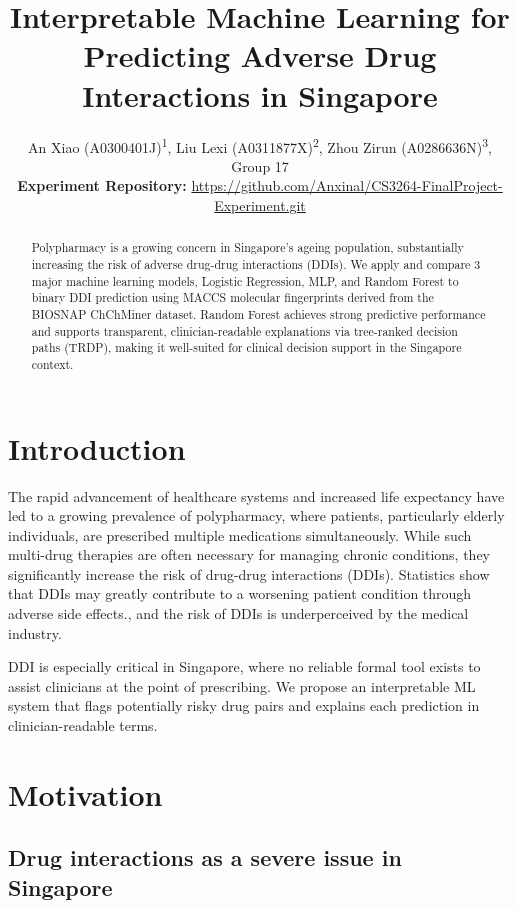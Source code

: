 \documentclass[letterpaper]{article} %
\title{Interpretable Machine Learning for Predicting Adverse Drug Interactions in Singapore}
\author{
    An Xiao (A0300401J)\textsuperscript{\rm 1},
    Liu Lexi (A0311877X)\textsuperscript{\rm 2},
    Zhou Zirun (A0286636N)\textsuperscript{\rm 3},
    Group 17\\
    \textbf{Experiment Repository:} \url{https://github.com/Anxinal/CS3264-FinalProject-Experiment.git}
}
\begin{document}
\maketitle



\begin{abstract}
Polypharmacy is a growing concern in Singapore's ageing population, substantially increasing the risk of adverse drug-drug interactions (DDIs). We apply and compare 3 major machine learning models, Logistic Regression, MLP, and Random Forest to binary DDI prediction using MACCS molecular fingerprints derived from the BIOSNAP ChChMiner dataset. Random Forest achieves strong predictive performance and supports transparent, clinician-readable explanations via tree-ranked decision paths (TRDP), making it well-suited for clinical decision support in the Singapore context.
\end{abstract}

\section{Introduction}

The rapid advancement of healthcare systems and increased life expectancy have led to a growing prevalence of polypharmacy, where patients, particularly elderly individuals, are prescribed multiple medications simultaneously. While such multi-drug therapies are often necessary for managing chronic conditions, they significantly increase the risk of drug-drug interactions (DDIs). Statistics show that DDIs may greatly contribute to a worsening patient condition through adverse side effects.\cite{Chan2016:chan}, and the risk of DDIs is underperceived by the medical industry.\cite{polypharmacy}

DDI is especially critical in Singapore,\cite{Ho2023} where no reliable formal tool exists to assist clinicians at the point of prescribing. We propose an interpretable ML system that flags potentially risky drug pairs and explains each prediction in clinician-readable terms.


\section{Motivation}

\subsection{Drug interactions as a severe issue in Singapore}
\end{document}
